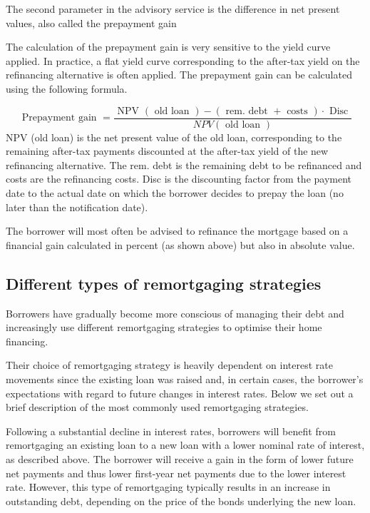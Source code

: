 \documentclass[12pt,twoside]{reedthesis}
\begin{document}
The second parameter in the advisory service is the difference in net present values, also called the prepayment gain

The calculation of the prepayment gain is very sensitive to the yield curve applied. In practice, a flat yield curve corresponding to the after-tax yield on the refinancing alternative is often applied. The prepayment gain can be calculated using the following formula.

\[
\text { Prepayment gain }=\frac{\text { NPV }(\text { old loan })-(\text { rem. debt }+\text { costs }) \cdot \text { Disc }}{N P V(\text { old loan })}
\]
NPV (old loan) is the net present value of the old loan, corresponding to the remaining after-tax payments discounted at the after-tax yield of the new refinancing alternative. The rem. debt is the remaining debt to be refinanced and costs are the refinancing costs. Disc is the discounting factor from the payment date to the actual date on which the borrower decides to prepay the loan (no later than the notification date).

The borrower will most often be advised to refinance the mortgage based on a financial gain calculated in percent (as shown above) but also in absolute value.

\hypertarget{different-types-of-remortgaging-strategies}{%
\subsection{Different types of remortgaging strategies}\label{different-types-of-remortgaging-strategies}}

Borrowers have gradually become more conscious of managing their debt and increasingly use different remortgaging strategies to optimise their home financing.

Their choice of remortgaging strategy is heavily dependent on interest rate movements since the existing loan was raised and, in certain cases, the borrower's expectations with regard to future changes in interest rates. Below we set out a brief description of the most commonly used remortgaging strategies.

Following a substantial decline in interest rates, borrowers will benefit from remortgaging an existing loan to a new loan with a lower nominal rate of interest, as described above. The borrower will receive a gain in the form of lower future net payments and thus lower first-year net payments due to the lower interest rate. However, this type of remortgaging typically results in an increase in outstanding debt, depending on the price of the bonds underlying the new loan.
\end{document}
